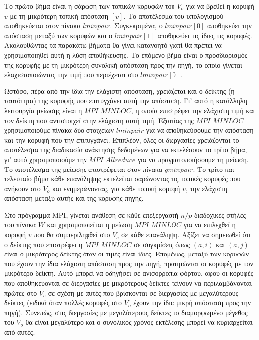 \documentclass[12pt,a4paper]{article}
\begin{document}
Το πρώτο βήμα είναι η σάρωση των τοπικών κορυφών του $V_o$ για να βρεθεί η κορυφή $v$ με τη μικρότερη τοπική απόσταση $[v]$. Το αποτέλεσμα του υπολογισμού αποθηκεύεται στον πίνακα \texttt{$lminpair$}. Συγκεκριμένα, ο \texttt{$lminpair[0]$} αποθηκεύει την απόσταση μεταξύ των κορυφών και ο \texttt{$lminpair[1]$} αποθηκεύει τις ίδιες τις κορυφές. Ακολουθώντας τα παρακάτω βήματα θα γίνει κατανοητό γιατί θα πρέπει να χρησιμοποιηθεί αυτή η λύση αποθήκευσης. Το επόμενο βήμα είναι ο προσδιορισμός της κορυφής με τη μικρότερη συνολική απόσταση προς την πηγή, το οποίο γίνεται ελαχιστοποιώντας την τιμή που περιέχεται στο \texttt{$lminpair[0]$}.

Ωστόσο, πέρα από την ίδια την ελάχιστη απόσταση, χρειάζεται και ο δείκτης (η ταυτότητα) της κορυφής που επιτυγχάνει αυτή την απόσταση. Γι' αυτό η κατάλληλη λειτουργία μείωσης είναι η \texttt{$MPI\_MINLOC$}, η οποία επιστρέφει την ελάχιστη τιμή και τον δείκτη που αντιστοιχεί στην ελάχιστη αυτή τιμή. Εξαιτίας της \texttt{$MPI\_MINLOC$} χρησιμοποιούμε πίνακα δύο στοιχείων \texttt{$lminpair$} για να αποθηκεύσουμε την απόσταση και την κορυφή που την επιτυγχάνει. Επιπλέον, όλες οι διεργασίες χρειάζονται το αποτέλεσμα της διαδικασία ανάκτησης δεδομένων για να εκτελέσουν το τρίτο βήμα, γι' αυτό χρησιμοποιούμε την \texttt{$MPI\_Allreduce$} για να πραγματοποιήσουμε τη μείωση. Το αποτέλεσμα της μείωσης επιστρέφεται στον πίνακα \texttt{$gminpair$}. Το τρίτο και τελευταίο βήμα κάθε επανάληψης εκτελείται σαρώνοντας τις τοπικές κορυφές που ανήκουν στο $V_o$ και ενημερώνοντας, για κάθε τοπική κορυφή $v$, την ελάχιστη απόσταση μεταξύ αυτής και της κορυφής-πηγής.

Στο πρόγραμμα \foreignlanguage{english}{MPI}, γίνεται ανάθεση σε κάθε επεξεργαστή $n/p$ διαδοχικές στήλες του πίνακα $W$ και χρησιμοποιείται η μείωση \texttt{$MPI\_MINLOC$} για να επιλεχθεί η κορυφή $v$ που θα συμπεριληφθεί στο $V_c$ σε κάθε επανάληψη. Αξίζει να σημειωθεί ότι ο δείκτης που επιστρέφει η \texttt{$MPI\_MINLOC$} σε συγκρίσεις όπως $(a,i)$ και $(a,j)$ είναι ο μικρότερος δείκτης όταν οι τιμές είναι ίδιες. Επομένως, μεταξύ των κορυφών που έχουν την ίδια ελάχιστη απόσταση προς την πηγή, προτιμώνται οι κορυφές με τον μικρότερο δείκτη. Αυτό μπορεί να οδηγήσει σε ανισορροπία φόρτου, αφού οι κορυφές που αποθηκεύονται σε διεργασίες με μικρότερους δείκτες τείνουν να περιλαμβάνονται πρώτες στο $V_c$ σε σχέση με αυτές που βρίσκονται σε διεργασίες με μεγαλύτερους δείκτες (ειδικά όταν πολλές κορυφές στο $V_o$ έχουν την ίδια μικρή απόσταση προς την πηγή). Συνεπώς, στις διεργασίες με μεγαλύτερους δείκτες το διαμορφωμένο μέγεθος του $V_o$ θα είναι μεγαλύτερο και ο συνολικός χρόνος εκτέλεσης μπορεί να κυριαρχείται από αυτές.
\end{document}
